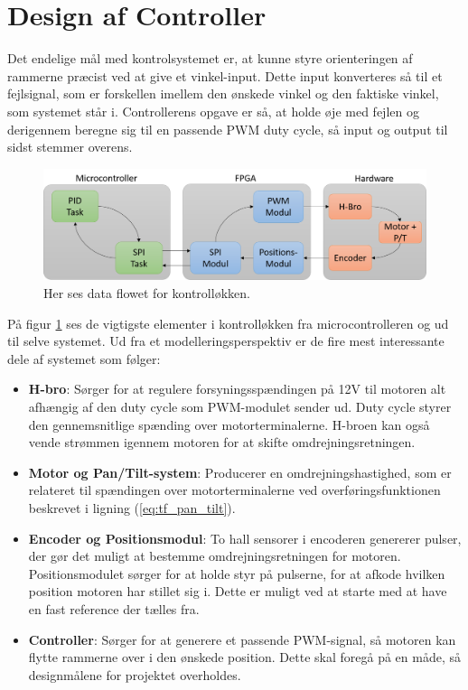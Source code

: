 \section{Design af Controller}
Det endelige mål med kontrolsystemet er, at kunne styre orienteringen af rammerne præcist ved at give et vinkel-input. Dette input konverteres så til et fejlsignal, som er forskellen imellem den ønskede vinkel og den faktiske vinkel, som systemet står i. Controllerens opgave er så, at holde øje med fejlen og derigennem beregne sig til en passende PWM duty cycle, så input og output til sidst stemmer overens. 

\begin{figure}[ht]
	\begin{center}
		\includegraphics[scale=0.5]{Billeder/Controller_Blok.png}
	\end{center}
\caption{Her ses data flowet for kontrolløkken.}
\label{fig:Blok_Model}
\end{figure}

På figur \ref{fig:Blok_Model} ses de vigtigste elementer i kontrolløkken fra microcontrolleren og ud til selve systemet. Ud fra et modelleringsperspektiv er de fire mest interessante dele af systemet som følger:

\begin{itemize}[noitemsep]
\item \textbf{H-bro}: Sørger for at regulere forsyningsspændingen på 12V til motoren alt afhængig af den duty cycle som PWM-modulet sender ud. Duty cycle styrer den gennemsnitlige spænding over motorterminalerne. H-broen kan også vende strømmen igennem motoren for at skifte omdrejningsretningen.
\item \textbf{Motor og Pan/Tilt-system}: Producerer en omdrejningshastighed, som er relateret til spændingen over motorterminalerne ved overføringsfunktionen beskrevet i ligning (\ref{eq:tf_pan_tilt}).
\item \textbf{Encoder og Positionsmodul}: To hall sensorer i encoderen genererer pulser, der gør det muligt at bestemme omdrejningsretningen for motoren. Positionsmodulet sørger for at holde styr på pulserne, for at afkode hvilken position motoren har stillet sig i. Dette er muligt ved at starte med at have en fast reference der tælles fra.
\item \textbf{Controller}: Sørger for at generere et passende PWM-signal, så motoren kan flytte rammerne over i den ønskede position. Dette skal foregå på en måde, så designmålene for projektet overholdes.
\end{itemize}


